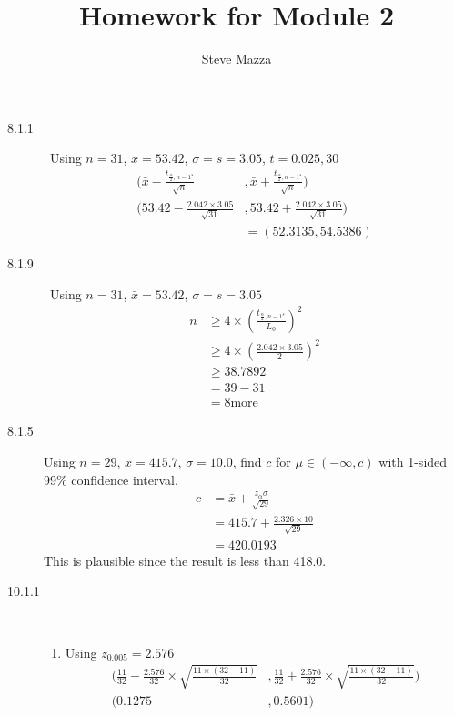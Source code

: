 \documentclass[letterpaper,10pt]{article}
\title{Homework for Module 2}
\author{Steve Mazza}
\begin{document}
\maketitle

\begin{description}
\item[8.1.1]\ Using $n=31$, $\bar{x}=53.42$, $\sigma=s=3.05$, $t=0.025,30$
\begin{align*}
(\bar{x}-\frac{t_{\frac{\alpha}{2},n-1^{s}}}{\sqrt{n}} &,\bar{x}+\frac{t_{\frac{\alpha}{2},n-1^{s}}}{\sqrt{n}}) \\
(53.42-\frac{2.042\times 3.05}{\sqrt{31}}&,53.42+\frac{2.042\times 3.05}{\sqrt{31}}) \\
&=(52.3135, 54.5386)
\end{align*}

\item[8.1.9]\ Using $n=31$, $\bar{x}=53.42$, $\sigma=s=3.05$
\begin{align*}
n&\geq 4\times(\frac{t_{\frac{\alpha}{2},n-1^{s}}}{L_{0}})^{2} \\
&\geq 4\times(\frac{2.042\times 3.05}{2})^{2} \\
&\geq 38.7892 \\
&= 39-31 \\
&= 8 \mbox{more}
\end{align*}

\item[8.1.5] Using $n=29$, $\bar{x}=415.7$, $\sigma=10.0$, find $c$ for $\mu\in(-\infty, c)$ with 1-sided 99\% confidence interval.
\begin{align*}
c&=\bar{x}+\frac{z_{\alpha}\sigma}{\sqrt{29}} \\
&=415.7+\frac{2.326\times10}{\sqrt{29}} \\
&=420.0193
\end{align*}
This is plausible since the result is less than 418.0.

\item[10.1.1]\ 
\begin{enumerate}
\item Using $z_{0.005} = 2.576$
\begin{align*}
(\frac{11}{32}-\frac{2.576}{32}\times\sqrt{\frac{11\times(32-11)}{32}}&,
\frac{11}{32}+\frac{2.576}{32}\times\sqrt{\frac{11\times(32-11)}{32}}) \\
(0.1275 &, 0.5601)
\end{align*}


\end{enumerate}
\end{description}
\end{document}
